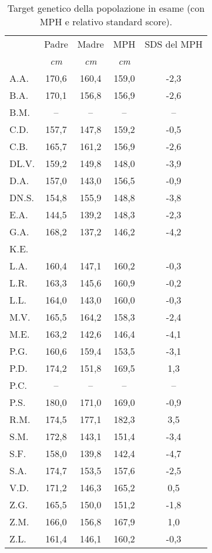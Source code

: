 \begin{table}[!h]
\begin{center}
\addtolength{\tabcolsep}{12pt}
\renewcommand{\arraystretch}{1.1}
\begin{tabular}{lcccc}
\toprule

 & Padre & Madre & MPH & SDS del MPH \\
 & \emph{cm} & \emph{cm} & \emph{cm} & \\
\midrule
A.A.	& 170,6 & 160,4 & 159,0 & -2,3  \\
B.A.	& 170,1 & 156,8 & 156,9 & -2,6  \\
B.M.	& --    & --    & --    & --    \\
C.D.	& 157,7 & 147,8 & 159,2 & -0,5  \\
C.B.	& 165,7 & 161,2 & 156,9 & -2,6  \\
DL.V.	& 159,2 & 149,8 & 148,0 & -3,9  \\
D.A.	& 157,0 & 143,0 & 156,5 & -0,9  \\
DN.S.	& 154,8 & 155,9 & 148,8 & -3,8  \\
E.A.	& 144,5 & 139,2 & 148,3 & -2,3  \\
G.A.	& 168,2 & 137,2 & 146,2 & -4,2  \\
K.E.	&  &  &  &  \\                 
L.A.	& 160,4 & 147,1 & 160,2 & -0,3  \\
L.R.	& 163,3 & 145,6 & 160,9 & -0,2  \\
L.L.	& 164,0 & 143,0 & 160,0 & -0,3  \\
M.V.	& 165,5 & 164,2 & 158,3 & -2,4  \\
M.E.	& 163,2 & 142,6 & 146,4 & -4,1  \\
P.G.	& 160,6 & 159,4 & 153,5 & -3,1  \\
P.D.	& 174,2 & 151,8 & 169,5 & 1,3   \\
P.C.	& --    & --    & --    & --    \\
P.S.	& 180,0 & 171,0 & 169,0 & -0,9  \\
R.M.	& 174,5 & 177,1 & 182,3 & 3,5   \\
S.M.	& 172,8 & 143,1 & 151,4 & -3,4  \\
S.F.	& 158,0 & 139,8 & 142,4 & -4,7  \\
S.A.	& 174,7 & 153,5 & 157,6 & -2,5  \\
V.D.	& 171,2 & 146,3 & 165,2 & 0,5   \\
Z.G.	& 165,5 & 150,0 & 151,2 & -1,8  \\
Z.M.	& 166,0 & 156,8 & 167,9 & 1,0   \\
Z.L.	& 161,4 & 146,1 & 160,2 & -0,3  \\
\bottomrule
\end{tabular}
\end{center}
\caption{Target genetico della popolazione in esame (con MPH e relativo standard score).}
\label{tab:TargetGenetici}
\end{table}

